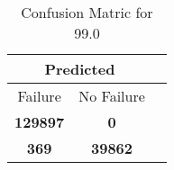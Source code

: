 \begin{table}[] 
\caption{Confusion Matric for 99.0} 
\label{Table: Prediction Accuracy-DMD99.0OnlySunEKF-resetReflectionperfectNoFailurePrediction-Reflection} 
\centering 
\begin{tabular} 
 {@{}ccc@{}} 
\toprule 
\multicolumn{2}{c}{\textbf{Predicted}}
 \\ \midrule 
\multicolumn{1}{|c|}{Failure} & 
\multicolumn{1}{c|}{No Failure}
 \\ \midrule 
\multicolumn{1}{|c|}{\color{green}\textbf{129897}} & 
\multicolumn{1}{c|}{\color{red}\textbf{0}}
 \\ \midrule 
\multicolumn{1}{|c|}{\color{red}\textbf{369}} & 
\multicolumn{1}{c|}{\color{green}\textbf{39862}}
 \\ \bottomrule 
\end{tabular} 
\end{table} 
